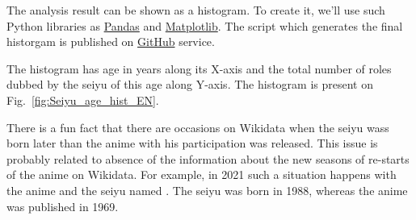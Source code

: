The analysis result can be shown as a histogram. To create it, we'll use such Python libraries as \href{https://en.wikipedia.org/wiki/Pandas\_(software)}{Pandas} and \href{https://en.wikipedia.org/wiki/Matplotlib}{Matplotlib}. The script which generates the final historgam is published on \href{https://git.io/J1UGA}{GitHub} service.

The histogram has age in years along its X-axis and the total number of roles dubbed by the seiyu of this age along Y-axis. The histogram is present on Fig.~\ref{fig:Seiyu_age_hist_EN}.

\begin{figure*}[h]

    \setlength{\fboxsep}{0pt}%
    \setlength{\fboxrule}{1pt}%
	\caption[Histogram of number of anime voiced by seiyu of different ages, 2021.]{Histogram of number of anime voiced by seiyu of different ages, 2021. The histogram is created according to the output of scripts~\protect\ref{lst:seiyu_bd_w_service} (or~\protect\ref{lst:seiyu_bd_w_rdfs}), \protect\ref{lst:all_anime_releases} and \protect\ref{lst:link_anime_seiyu}.}%
    \label{fig:Seiyu_age_hist_EN}%
\end{figure*} 

There is a fun fact that there are occasions on Wikidata when the seiyu wass born later than the anime with his participation was released. This issue is probably related to absence of the information about the new seasons of re-starts of the anime on Wikidata. For example, in 2021 such a situation happens with the  anime and the seiyu named . The seiyu was born in 1988, whereas the anime was published in 1969.

